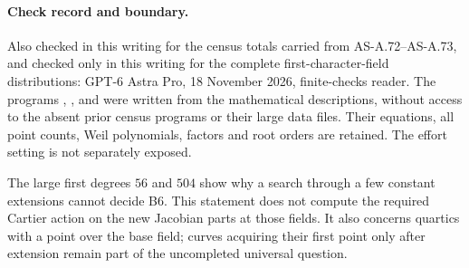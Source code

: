 \paragraph{Check record and boundary.}
Also checked in this writing for the census totals carried from
AS-A.72--AS-A.73, and checked only in this writing for the complete
first-character-field distributions: GPT-6 Astra Pro, 18 November
2026, finite-checks reader. The programs
,
, and
 were written from the
mathematical descriptions, without access to the absent prior
census programs or their large data files. Their equations, all
point counts, Weil polynomials, factors and root orders are retained.
The effort setting is not separately exposed.

The large first degrees $56$ and $504$ show why a search through a
few constant extensions cannot decide B6. This statement does not
compute the required Cartier action on the new Jacobian parts at
those fields. It also concerns quartics with a point over the base
field; curves acquiring their first point only after extension
remain part of the uncompleted universal question.
